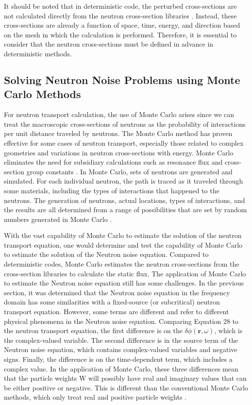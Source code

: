 It should be noted that in deterministic code, the perturbed cross-sections are not calculated directly from the neutron cross-section libraries \cite{ardiansyahEvaluationPBMR400Core2021}. Instead, these cross-sections are already a function of space, time, energy, and direction based on the mesh in which the calculation is performed. Therefore, it is essential to consider that the neutron cross-sections must be defined in advance in deterministic methods. 

\subsection{Solving Neutron Noise Problems using Monte Carlo Methods}

For neutron transport calculation, the use of Monte Carlo arises since we can treat the macroscopic cross-sections of neutrons as the probability of interactions per unit distance traveled by neutrons. The Monte Carlo method has proven effective for some cases of neutron transport, especially those related to complex geometries and variations in neutron cross-sections with energy. Monte Carlo eliminates the need for subsidiary calculations such as resonance flux and cross-section group constants \cite{bellNuclearReactorTheory1970, duderstadtNuclearReactorAnalysis1977}. In Monte Carlo, sets of neutrons are generated and simulated. For each individual neutron, the path is traced as it traveled through some materials, including the types of interactions that happened to the neutrons. The generation of neutrons, actual locations, types of interactions, and the results are all determined from a range of possibilities that are set by random numbers generated in Monte Carlo \cite{lewisComputationalMethodsNeutron1984, luxMonteCarloParticle1991}. 

With the vast capability of Monte Carlo to estimate the solution of the neutron transport equation, one would determine and test the capability of Monte Carlo to estimate the solution of the Neutron noise equation. Compared to deterministic codes, Monte Carlo estimates the neutron cross-sections from the cross-section libraries to calculate the static flux. The application of Monte Carlo to estimate the Neutron noise equation still has some challenges. In the previous section, it was determined that the Neutron noise equation in the frequency domain has some similarities with a fixed-source (or subcritical) neutron transport equation. However, some terms are different and refer to different physical phenomena in the Neutron noise equation. Comparing Equation 28 to the neutron transport equation, the first difference is on the $\delta \phi (\textbf{r}, \omega)$, which is the complex-valued variable. The second difference is in the source term of the Neutron noise equation, which contains complex-valued variables and negative signs. Finally, the difference is on the time-dependent term, which includes a complex value. In the application of Monte Carlo, these three differences mean that the particle weights W will possibly have real and imaginary values that can be either positive or negative. This is different than the conventional Monte Carlo methods, which only treat real and positive particle weights \cite{yamamotoMonteCarloMethod2013}.

